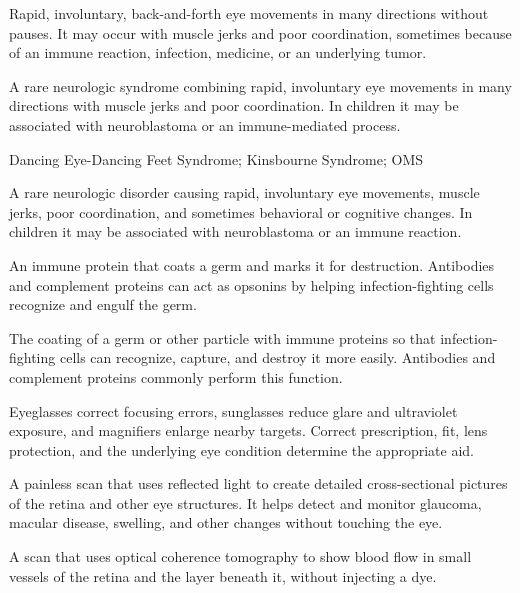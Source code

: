  Rapid, involuntary, back-and-forth eye movements in many directions without pauses. It may occur with muscle jerks and poor coordination, sometimes because of an immune reaction, infection, medicine, or an underlying tumor.

 A rare neurologic syndrome combining rapid, involuntary eye movements in many directions with muscle jerks and poor coordination. In children it may be associated with neuroblastoma or an immune-mediated process.

\synonyms
Dancing Eye-Dancing Feet Syndrome; Kinsbourne Syndrome; OMS

 A rare neurologic disorder causing rapid, involuntary eye movements, muscle jerks, poor coordination, and sometimes behavioral or cognitive changes. In children it may be associated with neuroblastoma or an immune reaction.

 An immune protein that coats a germ and marks it for destruction. Antibodies and complement proteins can act as opsonins by helping infection-fighting cells recognize and engulf the germ.

 The coating of a germ or other particle with immune proteins so that infection-fighting cells can recognize, capture, and destroy it more easily. Antibodies and complement proteins commonly perform this function.

 Eyeglasses correct focusing errors, sunglasses reduce glare and ultraviolet exposure, and magnifiers enlarge nearby targets. Correct prescription, fit, lens protection, and the underlying eye condition determine the appropriate aid.



 A painless scan that uses reflected light to create detailed cross-sectional pictures of the retina and other eye structures. It helps detect and monitor glaucoma, macular disease, swelling, and other changes without touching the eye.

 A scan that uses optical coherence tomography to show blood flow in small vessels of the retina and the layer beneath it, without injecting a dye.


